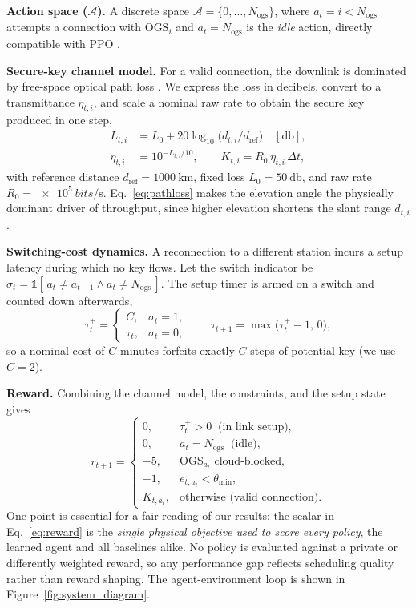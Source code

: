 \documentclass[manuscript, review, nonacm]{acmart}
\begin{document}
\textbf{Action space ($\mathcal{A}$).} A discrete space $\mathcal{A}=\{0,\dots,N_{\text{ogs}}\}$, where $a_t=i<N_{\text{ogs}}$ attempts a connection with $\text{OGS}_i$ and $a_t=N_{\text{ogs}}$ is the \textit{idle} action, directly compatible with PPO \cite{schulman2017proximal}.

\textbf{Secure-key channel model.} For a valid connection, the downlink is dominated by free-space optical path loss \cite{liao2017satellite, bourgoin2013comprehensive}. We express the loss in decibels, convert to a transmittance $\eta_{t,i}$, and scale a nominal raw rate to obtain the secure key produced in one step,
\begin{align}
L_{t,i} &= L_0 + 20\log_{10}\!\big(d_{t,i}/d_{\text{ref}}\big) \quad [\si{\decibel}], \label{eq:pathloss}\\
\eta_{t,i} &= 10^{-L_{t,i}/10}, \qquad
K_{t,i} = R_0\,\eta_{t,i}\,\Delta t, \label{eq:keyrate}
\end{align}
with reference distance $d_{\text{ref}}=\SI{1000}{\km}$, fixed loss $L_0=\SI{50}{\decibel}$, and raw rate $R_0=\SI{e5}{bits\per\second}$. Eq.~\eqref{eq:pathloss} makes the elevation angle the physically dominant driver of throughput, since higher elevation shortens the slant range $d_{t,i}$.

\textbf{Switching-cost dynamics.} A reconnection to a different station incurs a setup latency during which no key flows. Let the switch indicator be $\sigma_t = \mathbb{1}[\,a_t \neq a_{t-1} \wedge a_t \neq N_{\text{ogs}}\,]$. The setup timer is armed on a switch and counted down afterwards,
\begin{equation}
\tau_t^{+} = \begin{cases} C, & \sigma_t = 1,\\ \tau_t, & \sigma_t = 0,\end{cases}
\qquad
\tau_{t+1} = \max\!\big(\tau_t^{+}-1,\,0\big),
\label{eq:timer}
\end{equation}
so a nominal cost of $C$ minutes forfeits exactly $C$ steps of potential key (we use $C=2$).

\textbf{Reward.} Combining the channel model, the constraints, and the setup state gives
\begin{equation}
r_{t+1} =
\begin{cases}
0, & \tau_t^{+} > 0 \;\;\text{(in link setup),}\\
0, & a_t = N_{\text{ogs}} \;\;\text{(idle),}\\
-5, & \text{$\text{OGS}_{a_t}$ cloud-blocked,}\\
-1, & e_{t,a_t} < \theta_{\min},\\
K_{t,a_t}, & \text{otherwise (valid connection).}
\end{cases}
\label{eq:reward}
\end{equation}
One point is essential for a fair reading of our results: the scalar in Eq.~\eqref{eq:reward} is the \emph{single physical objective used to score every policy}, the learned agent and all baselines alike. No policy is evaluated against a private or differently weighted reward, so any performance gap reflects scheduling quality rather than reward shaping. The agent-environment loop is shown in Figure~\ref{fig:system_diagram}.
\end{document}
